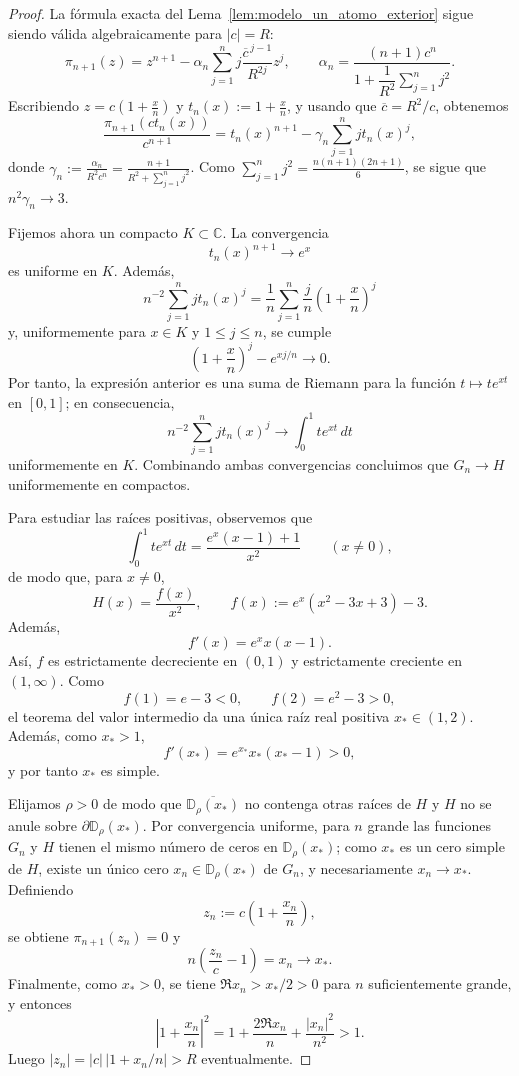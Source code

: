 \begin{proof}
	La fórmula exacta del Lema~\ref{lem:modelo_un_atomo_exterior} sigue siendo válida algebraicamente para $|c|=R$:
	\[
		\pi_{n+1}(z)=z^{n+1}-\alpha_n\sum_{j=1}^n j\frac{\overline c^{\,j-1}}{R^{2j}}z^j,
		\qquad
		\alpha_n=
		\frac{(n+1)c^n}{1+\dfrac1{R^2}\sum_{j=1}^n j^2}.
	\]
	Escribiendo $z=c\left(1+\frac{x}{n}\right)$ y $t_n(x):=1+\frac{x}{n}$,
	y usando que $\overline c=R^2/c$, obtenemos
	\[
		\frac{\pi_{n+1}(c t_n(x))}{c^{n+1}}
		=
		t_n(x)^{n+1}-\gamma_n\sum_{j=1}^n j t_n(x)^j,
	\]
	donde $\gamma_n:=\frac{\alpha_n}{R^2c^n}=\frac{n+1}{R^2+\sum_{j=1}^n j^2}$. Como $\sum_{j=1}^n j^2=\frac{n(n+1)(2n+1)}{6}$, se sigue que $n^2\gamma_n\longrightarrow 3$.

	Fijemos ahora un compacto $K\subset\mathbb C$. La convergencia
	\[
		t_n(x)^{n+1}\longrightarrow e^x
	\]
	es uniforme en $K$. Además,
	\[
		n^{-2}\sum_{j=1}^n j t_n(x)^j
		=
		\frac1n\sum_{j=1}^n \frac{j}{n}\left(1+\frac{x}{n}\right)^j
	\]
	y, uniformemente para $x\in K$ y $1\le j\le n$, se cumple
	\[
		\left(1+\frac{x}{n}\right)^j-e^{xj/n}\longrightarrow 0.
	\]
	Por tanto, la expresión anterior es una suma de Riemann para la función $t\mapsto t e^{xt}$ en $[0,1]$; en consecuencia,
	\[
		n^{-2}\sum_{j=1}^n j t_n(x)^j
		\longrightarrow
		\int_0^1 t e^{xt}\,dt
	\]
	uniformemente en $K$. Combinando ambas convergencias concluimos que $G_n\to H$ uniformemente en compactos.

	Para estudiar las raíces positivas, observemos que
	\[
		\int_0^1 t e^{xt}\,dt=
		\frac{e^x(x-1)+1}{x^2}
		\qquad (x\neq 0),
	\]
	de modo que, para $x\neq 0$,
	\[
		H(x)=\frac{f(x)}{x^2},
		\qquad
		f(x):=e^x(x^2-3x+3)-3.
	\]
	Además,
	\[
		f'(x)=e^x x(x-1).
	\]
	Así, $f$ es estrictamente decreciente en $(0,1)$ y estrictamente creciente en $(1,\infty)$. Como
	\[
		f(1)=e-3<0,
		\qquad
		f(2)=e^2-3>0,
	\]
	el teorema del valor intermedio da una única raíz real positiva $x_*\in(1,2)$. Además, como $x_*>1$,
	\[
		f'(x_*)=e^{x_*}x_*(x_*-1)>0,
	\]
	y por tanto $x_*$ es simple.

	Elijamos $\rho>0$ de modo que $\overline{\mathbb D_\rho(x_*)}$ no contenga otras raíces de $H$ y $H$ no se anule sobre $\partial\mathbb D_\rho(x_*)$. Por convergencia uniforme, para $n$ grande las funciones $G_n$ y $H$ tienen el mismo número de ceros en $\mathbb D_\rho(x_*)$; como $x_*$ es un cero simple de $H$, existe un único cero $x_n\in\mathbb D_\rho(x_*)$ de $G_n$, y necesariamente $x_n\to x_*$. Definiendo
	\[
		z_n:=c\left(1+\frac{x_n}{n}\right),
	\]
	se obtiene $\pi_{n+1}(z_n)=0$ y
	\[
		n\left(\frac{z_n}{c}-1\right)=x_n\longrightarrow x_*.
	\]
	Finalmente, como $x_*>0$, se tiene $\Re x_n>x_*/2>0$ para $n$ suficientemente grande, y entonces
	\[
		\left|1+\frac{x_n}{n}\right|^2
		=
		1+\frac{2\Re x_n}{n}+\frac{|x_n|^2}{n^2}>1.
	\]
	Luego $|z_n|=|c|\,\bigl|1+x_n/n\bigr|>R$ eventualmente.
\end{proof}

